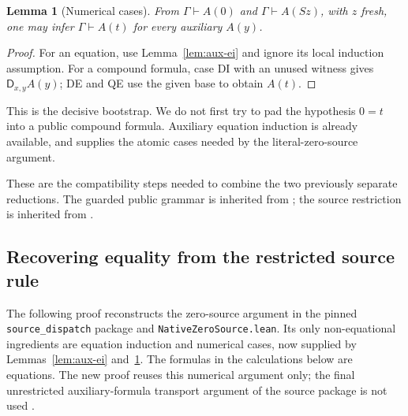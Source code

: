 \documentclass[11pt,letterpaper]{article}
\newtheorem{lemma}[theorem]{Lemma}
\theoremstyle{definition}
\newcommand{\D}{\mathsf D}
\begin{document}
\begin{lemma}[Numerical cases]\label{lem:aux-cases}
From $\Gamma\vdash A(0)$ and $\Gamma\vdash A(Sz)$, with $z$ fresh,
one may infer $\Gamma\vdash A(t)$ for every auxiliary $A(y)$.
\end{lemma}
\begin{proof}
For an equation, use Lemma~\ref{lem:aux-ei} and ignore its local induction
assumption.  For a compound formula, case DI with an unused witness
gives $\D_{x,y}A(y)$; DE and QE use the given base to obtain $A(t)$.
\end{proof}

This is the decisive bootstrap.  We do not first try to pad the hypothesis
$0=t$ into a public compound formula.  Auxiliary equation induction is
already available, and supplies the atomic cases needed by the
literal-zero-source argument.

These are the compatibility steps needed to combine the two previously
separate reductions.  The guarded public grammar is inherited from
\cite{guarded}; the source restriction is inherited from \cite{source}.

\subsection{Recovering equality from the restricted source rule}

The following proof reconstructs the zero-source argument in the pinned
\texttt{source\_dispatch} package and
\texttt{NativeZeroSource.lean}.  Its only non-equational ingredients are
equation induction and numerical cases, now supplied by
Lemmas~\ref{lem:aux-ei} and~\ref{lem:aux-cases}.  The formulas in the
calculations below are equations.
The new proof reuses this numerical argument only; the final unrestricted
auxiliary-formula transport argument of the source package is not used
\cite{source,lean-zero}.
\end{document}
